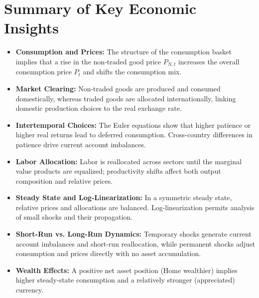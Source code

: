 \documentclass[a4paper,12pt]{article} %
\theoremstyle{nonitalic}
\begin{document}
\section{Summary of Key Economic Insights}
\begin{itemize}
    \item \textbf{Consumption and Prices:} The structure of the consumption basket implies that a rise in the non‐traded good price $ P_{N,t} $ increases the overall consumption price $ P_t $ and shifts the consumption mix.
    \item \textbf{Market Clearing:} Non-traded goods are produced and consumed domestically, whereas traded goods are allocated internationally, linking domestic production choices to the real exchange rate.
    \item \textbf{Intertemporal Choices:} The Euler equations show that higher patience or higher real returns lead to deferred consumption. Cross-country differences in patience drive current account imbalances.
    \item \textbf{Labor Allocation:} Labor is reallocated across sectors until the marginal value products are equalized; productivity shifts affect both output composition and relative prices.
    \item \textbf{Steady State and Log-Linearization:} In a symmetric steady state, relative prices and allocations are balanced. Log-linearization permits analysis of small shocks and their propagation.
    \item \textbf{Short-Run vs. Long-Run Dynamics:} Temporary shocks generate current account imbalances and short-run reallocation, while permanent shocks adjust consumption and prices directly with no asset accumulation.
    \item \textbf{Wealth Effects:} A positive net asset position (Home wealthier) implies higher steady-state consumption and a relatively stronger (appreciated) currency.
\end{itemize}
\end{document}
